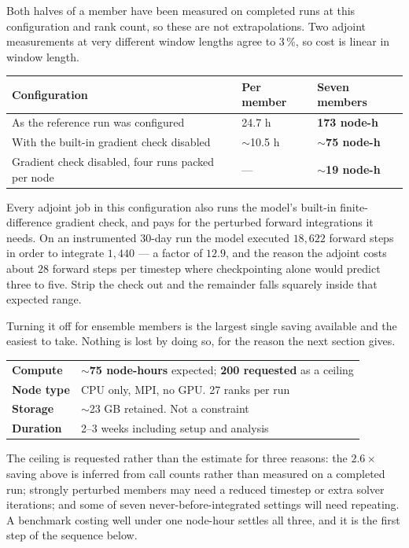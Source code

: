 Both halves of a member have been measured on completed runs at this
configuration and rank count, so these are not extrapolations. Two adjoint
measurements at very different window lengths agree to $3\,\%$, so cost is
linear in window length.

\smallskip
\begin{tabularx}{\textwidth}{@{}Y{1.6}Y{0.6}Y{0.8}@{}}
\toprule
\textbf{Configuration} & \textbf{Per member} & \textbf{Seven members}\\
\midrule
As the reference run was configured & 24.7 h & \textbf{173 node-h}\\
With the built-in gradient check disabled & $\sim$10.5 h & \textbf{$\sim$75 node-h}\\
Gradient check disabled, four runs packed per node & --- & \textbf{$\sim$19 node-h}\\
\bottomrule
\end{tabularx}
\smallskip

Every adjoint job in this configuration also runs the model's built-in
finite-difference gradient check, and pays for the perturbed forward
integrations it needs. On an instrumented 30-day run the model executed
$18{,}622$ forward steps in order to integrate $1{,}440$ --- a factor of
$12.9$, and the reason the adjoint costs about $28$ forward steps per timestep
where checkpointing alone would predict three to five. Strip the check out and
the remainder falls squarely inside that expected range.

Turning it off for ensemble members is the largest single saving available and
the easiest to take. Nothing is lost by doing so, for the reason the next
section gives.


\smallskip
\begin{tabularx}{\textwidth}{@{}Y{0.42}Y{1.58}@{}}
\toprule
\textbf{Compute} & \textbf{$\sim$75 node-hours} expected; \textbf{200 requested}
  as a ceiling\\
\textbf{Node type} & CPU only, MPI, no GPU. 27 ranks per run\\
\textbf{Storage} & $\sim$23 GB retained. Not a constraint\\
\textbf{Duration} & 2--3 weeks including setup and analysis\\
\bottomrule
\end{tabularx}
\smallskip

The ceiling is requested rather than the estimate for three reasons: the
$2.6\times$ saving above is inferred from call counts rather than measured on a
completed run; strongly perturbed members may need a reduced timestep or extra
solver iterations; and some of seven never-before-integrated settings will need
repeating. A benchmark costing well under one node-hour settles all three, and
it is the first step of the sequence below.
